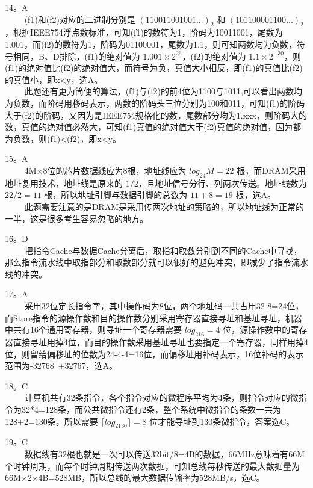 14。A \\
$\qquad$ (f1)和(f2)对应的二进制分别是 $(110011001001...)_2$ 和 $(101100001100...)_2$，根据IEEE754浮点数标准，可知(f1)的数符为1，阶码为10011001，尾数为1.001，而(f2)的数符为1，阶码为01100001，尾数为1.1，则可知两数均为负数，符号相同，B、D排除，(f1)的绝对值为 $1.001\times2^{26}$，(f2)的绝对值为 $1.1\times2^{-30}$，则(f1)的绝对值比(f2)的绝对值大，而符号为负，真值大小相反，即(f1)的真值比(f2)的真值小，即x<y，选A。 \\
$\qquad$ 此题还有更为简便的算法，(f1)与(f2)的前4位为1100与1011,可以看出两数均为负数，而阶码用移码表示，两数的阶码头三位分别为100和011，可知(f1)的阶码大于(f2)的阶码，又因为是IEEE754规格化的数，尾数部分均为1.xxx，则阶码大的数，真值的绝对值必然大，可知(f1)真值的绝对值大于(f2)真值的绝对值，因为都为负数，则(f1)<(f2)，即x<y。

15。A \\
$\qquad$ 4M×8位的芯片数据线应为8根，地址线应为 $log_24M=22$ 根，而DRAM采用地址复用技术，地址线是原来的 $1/2$，且地址信号分行、列两次传送。地址线数为 $22/2=11$ 根，所以地址引脚与数据引脚的总数为 $11+8=19$ 根，选A。 \\
$\qquad$ 此题需要注意的是DRAM是采用传两次地址的策略的，所以地址线为正常的一半，这是很多考生容易忽略的地方。

16。D \\
$\qquad$ 把指令Cache与数据Cache分离后，取指和取数分别到不同的Cache中寻找，那么指令流水线中取指部分和取数部分就可以很好的避免冲突，即减少了指令流水线的冲突。

17。A \\
$\qquad$ 采用32位定长指令字，其中操作码为8位，两个地址码一共占用32-8=24位，而Store指令的源操作数和目的操作数分别采用寄存器直接寻址和基址寻址，机器中共有16个通用寄存器，则寻址一个寄存器需要 $log_216=4$ 位，源操作数中的寄存器直接寻址用掉4位，而目的操作数采用基址寻址也要指定一个寄存器，同样用掉4位，则留给偏移址的位数为24-4-4=16位，而偏移址用补码表示，16位补码的表示范围为-32768~+32767，选A。

18。C \\
$\qquad$ 计算机共有32条指令，各个指令对应的微程序平均为4条，则指令对应的微指令为32*4=128条，而公共微指令还有2条，整个系统中微指令的条数一共为128+2=130条，所以需要 $\lceil log_2130 \rceil =8$ 位才能寻址到130条微指令，答案选C。

19。C \\
$\qquad$ 数据线有32根也就是一次可以传送32bit/8=4B的数据，66MHz意味着有66M个时钟周期，而每个时钟周期传送两次数据，可知总线每秒传送的最大数据量为66M×2×4B=528MB，所以总线的最大数据传输率为528MB/s，选C。

